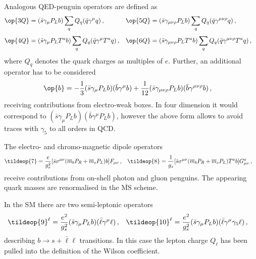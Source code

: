 Analogous QED-penguin operators are defined as 
\begin{equation}
\begin{aligned}
  \op{3Q} & = (\bar{s} \gamma_\mu P_L b)     \sum_q Q_q (\bar{q} \gamma^\mu q) \,, & 
  \op{5Q} & = (\bar{s} \gamma_{\mu\nu\rho} P_L b)
             \sum_q Q_q (\bar{q} \gamma^{\mu\nu\rho} q) \,, &
\\[1mm]   
  \op{4Q} & = (\bar{s} \gamma_\mu P_L T^a b) \sum_q Q_q (\bar{q} \gamma^\mu T^a q) \,, &
  \op{6Q} & = (\bar{s} \gamma_{\mu\nu\rho} P_L T^a b) 
             \sum_q Q_q (\bar{q} \gamma^{\mu\nu\rho} T^a q) \,,
\end{aligned}
\end{equation}
where $Q_q$ denotes the quark charges as multiples of $e$. Further, an additional
operator has to be considered
\begin{align}
  \op{b} & = -\frac{1}{3}  (\bar{s} \gamma_\mu P_L b)(\bar{b} \gamma^\mu b)
             +\frac{1}{12} (\bar{s} \gamma_{\mu\nu\rho} P_L b)
                           (\bar{b} \gamma^{\mu\nu\rho} b) \,,
\end{align}
receiving contributions from electro-weak boxes. In four dimension it would
correspond to $(\bar{s} \gamma_\mu P_L b)(\bar{b} \gamma^\mu P_L b)$, however
the above form allows to avoid traces with $\gamma_5$ to all orders in QCD.

The electro- and chromo-magnetic dipole operators
\begin{align}
  \tildeop{7} & = \frac{e}{g_s^2} [\bar{s} \sigma^{\mu \nu} 
                  (\overline{m}_b P_R + \overline{m}_s P_L) b] F_{\mu \nu} \,, &
  \tildeop{8} & = \frac{1}{g_s}   [\bar{s} \sigma^{\mu \nu}
                  (\overline{m}_b P_R + \overline{m}_s P_L) T^a b] G_{\mu \nu}^a \,, &  
\end{align}
receive contributions from on-shell photon and gluon penguins. The appearing
quark masses are renormalised in the $\overline{\mbox{MS}}$ scheme. 

In the SM there are two semi-leptonic operators
\begin{align}
  \tildeop{9}^{\ell}  & = \frac{e^2}{g_s^2} (\bar{s} \gamma_\mu P_L b) 
                          (\bar{\ell} \gamma^\mu \ell) \,, &
  \tildeop{10}^{\ell} & = \frac{e^2}{g_s^2} (\bar{s} \gamma_\mu P_L b)
                          (\bar{\ell} \gamma^\mu \gamma_5 \ell) \,,
\end{align}
describing $b\to s + \bar\ell\ell$ transitions. In this case the lepton
charge $Q_\ell$ has been pulled into the definition of the Wilson
coefficient.

